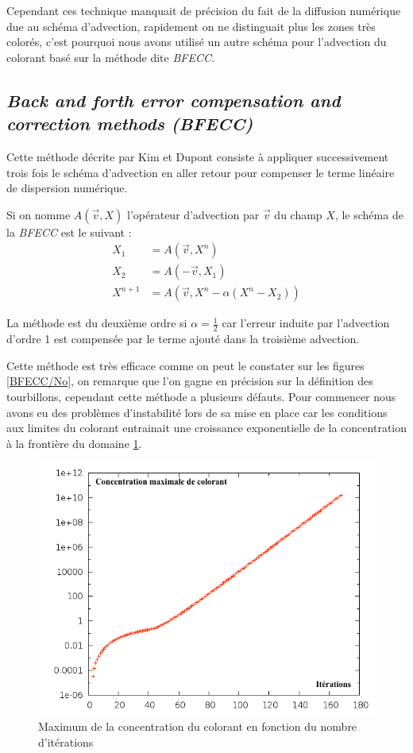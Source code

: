 		Cependant ces technique manquait de précision du fait de la diffusion numérique due au schéma d'advection, rapidement on ne distinguait plus les zones très colorés, c'est pourquoi nous avons utilisé un autre schéma pour l'advection du colorant basé sur la méthode dite \emph{BFECC}.
		
	\subsection{\emph{Back and forth error compensation and correction methods (BFECC)}}
		Cette méthode décrite par Kim \cite{Advect} et Dupont \cite{BFECC} consiste à appliquer successivement trois fois le schéma d'advection en aller retour pour compenser le terme linéaire de dispersion numérique.
		
		Si on nomme $A(\overrightarrow{v},X)$ l'opérateur d'advection par $\overrightarrow{v}$ du champ $X$, le schéma de la \emph{BFECC} est le suivant :
		\begin{align*}
  			X_1 &	= A(\overrightarrow{v},X^n) \\
			X_2	&	= A(-\overrightarrow{v},X_1)\\
			X^{n+1}&	= A(\overrightarrow{v},X^n-\alpha(X^n-X_2))
		\end{align*}	
		
		La méthode est du deuxième ordre si $\alpha = \frac{1}{2} $ car l'erreur induite par l'advection d'ordre 1 est compensée par le terme ajouté dans la troisième advection.
		
		Cette méthode est très efficace comme on peut le constater sur les figures \ref{BFECC/No}, on remarque que l'on gagne en précision sur la définition des tourbillons, cependant cette méthode a plusieurs défauts. Pour commencer nous avons eu des problèmes d'instabilité lors de sa mise en place car les conditions aux limites du colorant entrainait une croissance exponentielle de la concentration à la frontière du domaine \ref{instabilite}.
		
		\begin{figure}
			\begin{center}
			\includegraphics[width=0.7 \textwidth]{instabilite.png}
			\caption{Maximum de la concentration du colorant en fonction du nombre d'itérations}
			\label{instabilite}
			\end{center}
		\end{figure}
		
